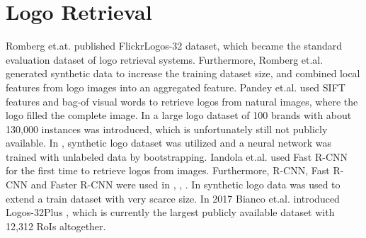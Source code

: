 \section{Logo Retrieval}
Romberg et.at. \cite{Romberg:2011:SLR:1991996.1992021} published FlickrLogos-32 dataset, which became the standard evaluation dataset of logo retrieval systems. Furthermore, Romberg et.al. \cite{conf/mir/RombergL13} generated synthetic data to increase the training dataset size, and combined local features from logo images into an aggregated feature. Pandey et.al. \cite{DBLP:conf/icip/PandeyDJPB14} used SIFT features and bag-of visual words to retrieve logos from natural images, where the logo filled the complete image. In \cite{DBLP:journals/corr/HoiWLWWXW15} a large logo dataset of 100 brands with about 130,000 instances was introduced, which is unfortunately still not publicly available. In \cite{Eggert:2015:BSD:2733373.2806407}, synthetic logo dataset was utilized and a neural network was trained with unlabeled data by bootstrapping. Iandola et.al. \cite{DBLP:journals/corr/IandolaSGK15} used Fast R-CNN for the first time to retrieve logos from images. Furthermore, R-CNN, Fast R-CNN and Faster R-CNN were used in \cite{Bao:2016:RCL:3007669.3007728}, \cite{DBLP:journals/corr/OliveiraFPR16}, \cite{DBLP:journals/spl/QiSWX17}. In \cite{DBLP:journals/corr/SuZG16} synthetic logo data was used to extend a train dataset with very scarce size. In 2017 Bianco et.al. introduced Logos-32Plus \cite{bianco2017deep}, which is currently the largest publicly available dataset with 12,312 RoIs altogether.